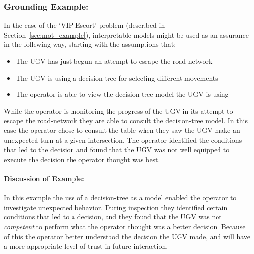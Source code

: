 \subsubsection{Grounding Example:}
In the case of the `VIP Escort' problem (described in Section~\ref{sec:mot_example}), interpretable models might be used as an assurance in the following way, starting with the assumptions that:

\begin{itemize}
    \item The UGV has just begun an attempt to escape the road-network
    \item The UGV is using a decision-tree for selecting different movements
    \item The operator is able to view the decision-tree model the UGV is using
\end{itemize}

While the operator is monitoring the progress of the UGV in its attempt to escape the road-network they are able to consult the decision-tree model. In this case the operator chose to consult the table when they saw the UGV make an unexpected turn at a given intersection. The operator identified the conditions that led to the decision and found that the UGV was not well equipped to execute the decision the operator thought was best.
\paragraph{\textbf{Discussion of Example:}} In this example the use of a decision-tree as a model enabled the operator to investigate unexpected behavior. During inspection they identified certain conditions that led to a decision, and they found that the UGV was not \emph{competent} to perform what the operator thought was a better decision. Because of this the operator better understood the decision the UGV made, and will have a more appropriate level of trust in future interaction.
